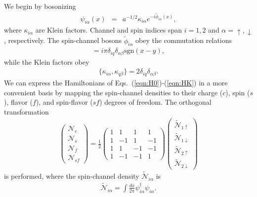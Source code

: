 \documentclass[aps,prb,twocolumn,superscriptaddress]{revtex4-1}
\begin{document}
We begin by bosonizing~\cite{delft1998bosonize,delft1998kondo}
\begin{eqnarray}
\psi_{i\alpha}(x)&=&a^{-1/2}\kappa_{i\alpha}e^{-i\tilde{\phi}_{i\alpha}(x)}, \label{eqn:boson_identity} 
\end{eqnarray}
where $\kappa_{i\alpha}$ are Klein factors. Channel and spin indices span $i=1,2$ and $\alpha=\uparrow,\downarrow$ , respectively. The spin-channel bosons $\tilde{\phi}_{i\alpha}$ obey the commutation relations
\begin{eqnarray}
[\tilde{\phi}_{i\alpha}(x),\tilde{\phi}_{q\beta}(y)]=i\pi\delta_{iq}\delta_{\alpha\beta}\mathrm{sgn}(x-y), \label{eqn:boson_relations}
\end{eqnarray}
while the Klein factors obey
\begin{eqnarray}
\{\kappa_{i\alpha},\kappa_{q\beta}\}=2\delta_{iq}\delta_{\alpha\beta}. \label{eqn:klein_relations1}
\end{eqnarray}
We can express the Hamiltonians of Eqs.~(\ref{eqn:H0})-(\ref{eqn:HK}) in a more convenient basis by mapping the spin-channel densities to their charge ($c$), spin ($s$), flavor ($f$), and spin-flavor ($sf$) degrees of freedom. The orthogonal transformation 
\begin{eqnarray}
\left( \begin{array}{c} \mathcal{N}_{c} \\ \mathcal{N}_{s} \\ \mathcal{N}_{f} \\ \mathcal{N}_{sf} \end{array} \right)=\frac{1}{2}\left( \begin{array}{cccc} 1 & 1 & 1 & 1 \\ 1 & -1 & 1 & -1 \\ 1 & 1 & -1 & -1 \\ 1 & -1 & -1 & 1 \end{array} \right)\left( \begin{array}{c} \tilde{\mathcal{N}}_{1\uparrow} \\ \tilde{\mathcal{N}}_{1\downarrow} \\ \tilde{\mathcal{N}}_{2\uparrow} \\ \tilde{\mathcal{N}}_{2\downarrow} \end{array} \right) \label{eqn:orthog_trnsfrm}
\end{eqnarray}
is performed, where the spin-channel density $\tilde{\mathcal{N}}_{i\alpha}$ is
\begin{eqnarray}
\tilde{\mathcal{N}}_{i\alpha}=\int\frac{dx}{2\pi}\psi_{i\alpha}^\dagger\psi_{i\alpha}. \label{eqn:density}
\end{eqnarray}
\end{document}
